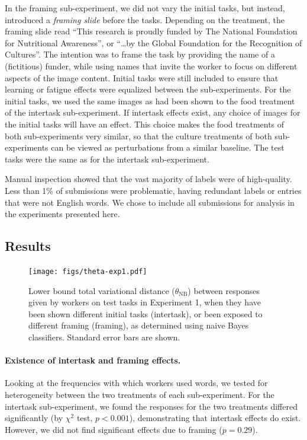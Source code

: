 \documentclass{sigchi}
\begin{document}
In the framing sub-experiment, we did not vary the initial tasks, but 
instead, introduced a \textit{framing slide} before the tasks.  
Depending on the treatment, the framing slide read 
``This research is proudly funded by The National Foundation for 
Nutritional Awareness'', or ``\ldots by the Global Foundation for the 
Recognition of Cultures''.  The intention was to frame the task by
providing the name of a (fictitious) funder, while using names that
invite the worker to focus on different aspects of the image content.  
Initial tasks were still included to ensure that learning or fatigue 
effects were equalized between the sub-experiments.  
For the initial tasks, we used the same images as had been shown to the 
food treatment of the intertask sub-experiment.  
If intertask effects exist, any choice of images for the initial tasks 
will have an effect.  This choice makes the food treatments of both 
sub-experiments very similar, so that the culture treatments of both 
sub-experiments can be viewed as perturbations from a similar baseline.  
The test tasks were the same as for the intertask sub-experiment.

Manual inspection showed that the vast majority of labels were of 
high-quality.  Less than 1\% of submissions were problematic, having
redundant labels or entries that were not English words.
We chose to include all submissions for analysis in the experiments
presented here.

\subsection{Results}

\begin{figure}[t]
    \centering
	\texttt{[image: figs/theta-exp1.pdf]}
	\caption{
	    Lower bound total variational distance ($\theta_\mathrm{NB}$) 
		between responses given
		by workers on test tasks in Experiment 1, when they have been 
		shown different initial tasks (intertask), or been exposed to
		different framing (framing), as determined using naive Bayes 
		classifiers.  Standard error bars are shown.
	}
	\label{fig:theta-exp1}
\end{figure}

\paragraph{Existence of intertask and framing effects.} 
Looking at the frequencies with which workers used words, we tested for
heterogeneity between the two treatments of each sub-experiment.
For the intertask sub-experiment, we found the responses 
for the two treatments differed significantly 
(by $\chi^2$ test, $p<0.001$), 
demonstrating that intertask effects do exist.  However, we did not find 
significant effects due to framing ($p=0.29$).
\end{document}
